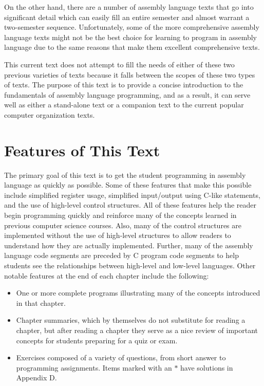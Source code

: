 \documentclass[10pt]{book}
\begin{document}
On the other hand, there are a number of assembly language texts that go into significant detail which can easily fill an entire semester and almost warrant a two-semester sequence. Unfortunately, some of the more comprehensive assembly language texts might not be the best choice for learning to program in assembly language due to the same reasons that make them excellent comprehensive texts.

This current text does not attempt to fill the needs of either of these two previous varieties of texts because it falls between the scopes of these two types of texts. The purpose of this text is to provide a concise introduction to the fundamentals of assembly language programming, and as a result, it can serve well as either a stand-alone text or a companion text to the current popular computer organization texts.

\section{Features of This Text}
The primary goal of this text is to get the student programming in assembly language as quickly as possible. Some of these features that make this possible include simplified register usage, simplified input/output using C-like statements, and the use of high-level control structures. All of these features help the reader begin programming quickly and reinforce many of the concepts learned in previous computer science courses. Also, many of the control structures are implemented without the use of high-level structures to allow readers to understand how they are actually implemented. Further, many of the assembly language code segments are preceded by C program code segments to help students see the relationships between high-level and low-level languages. Other notable features at the end of each chapter include the following:

\begin{itemize}
  \item One or more complete programs illustrating many of the concepts introduced in that chapter.
  \item Chapter summaries, which by themselves do not substitute for reading a chapter, but after reading a chapter they serve as a nice review of important concepts for students preparing for a quiz or exam.
  \item Exercises composed of a variety of questions, from short answer to programming assignments. Items marked with an $*$ have solutions in Appendix D.
\end{itemize}
\end{document}
